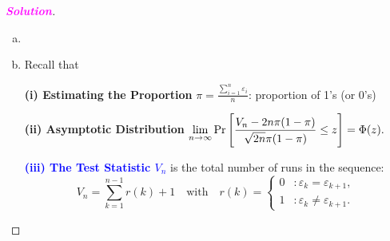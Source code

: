 \documentclass[12pt,openany]{book}
\theoremstyle{definition}
\newcommand{\E}{\mathbb{E}}
\newcommand{\sol}{\textcolor{magenta}{\bf Solution}}
\newcommand{\of}[1]{\left(#1\right)}
\begin{document}
\newpage
\begin{proof}[\sol]
	\ \begin{enumerate}[(a)]
		\item 
		\item Recall that
	
		\begin{tcolorbox}[colback=white,colframe=lemcolor,arc=5pt,title={\color{white}\bf Runs Test}]
		\textbf{(i) Estimating the Proportion} \(\displaystyle \pi=\frac{\sum_{i=1}^{n} \varepsilon_i}{n} \): proportion of 1's (or 0's)
		
		\textbf{(ii) Asymptotic Distribution} $
		\displaystyle
		\lim\limits_{n\to\infty}\Pr\sbr{\frac{V_n - 2n\pi(1 - \pi)}{\sqrt{2n}\pi(1 - \pi)}\leq z}=\Phi(z).
		$
		
		\textcolor{blue}{\bf (iii) The Test Statistic \( V_n \)} is the total number of runs in the sequence:\[
		V_n=\sum_{k=1}^{n-1}r(k)+1\quad\text{with}\quad r(k)=\begin{cases}
			0 &:\varepsilon_k=\varepsilon_{k+1},\\
			1 &:\varepsilon_k\neq\varepsilon_{k+1}.
		\end{cases}
		\]
		

\end{tcolorbox}
\end{enumerate}
\end{proof}
\end{document}
